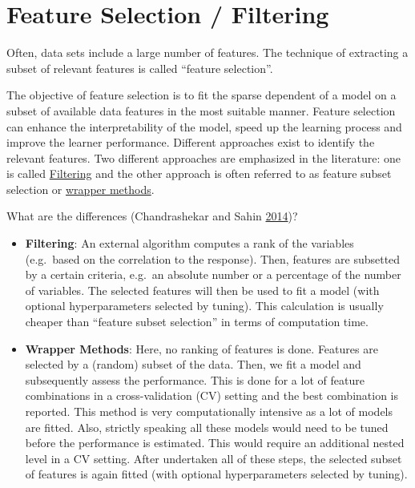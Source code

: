 \documentclass[]{scrbook}
\providecommand{\tightlist}{%
  \setlength{\itemsep}{0pt}\setlength{\parskip}{0pt}}
\begin{document}
\hypertarget{fs}{%
\section{Feature Selection / Filtering}\label{fs}}

Often, data sets include a large number of features.
The technique of extracting a subset of relevant features is called ``feature selection''.

The objective of feature selection is to fit the sparse dependent of a model on a subset of available data features in the most suitable manner.
Feature selection can enhance the interpretability of the model, speed up the learning process and improve the learner performance.
Different approaches exist to identify the relevant features.
Two different approaches are emphasized in the literature:
one is called \protect\hyperlink{fs-filtering}{Filtering} and the other approach is often referred to as feature subset selection or \protect\hyperlink{fs-wrapper}{wrapper methods}.

What are the differences (Chandrashekar and Sahin \protect\hyperlink{ref-chandrashekar2014}{2014})?

\begin{itemize}
\tightlist
\item
  \textbf{Filtering}: An external algorithm computes a rank of the variables (e.g.~based on the correlation to the response).
  Then, features are subsetted by a certain criteria, e.g.~an absolute number or a percentage of the number of variables.
  The selected features will then be used to fit a model (with optional hyperparameters selected by tuning).
  This calculation is usually cheaper than ``feature subset selection'' in terms of computation time.
\item
  \textbf{Wrapper Methods}: Here, no ranking of features is done.
  Features are selected by a (random) subset of the data.
  Then, we fit a model and subsequently assess the performance.
  This is done for a lot of feature combinations in a cross-validation (CV) setting and the best combination is reported.
  This method is very computationally intensive as a lot of models are fitted.
  Also, strictly speaking all these models would need to be tuned before the performance is estimated.
  This would require an additional nested level in a CV setting.
  After undertaken all of these steps, the selected subset of features is again fitted (with optional hyperparameters selected by tuning).
\end{itemize}
\end{document}

